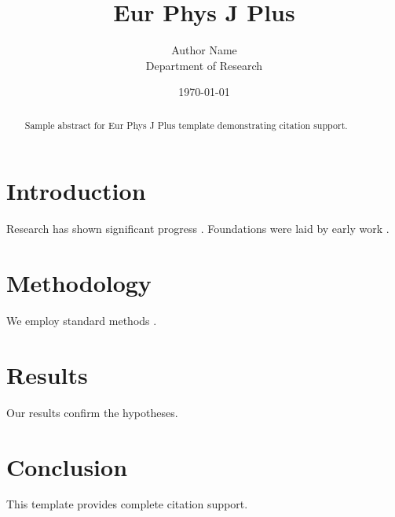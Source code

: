 \documentclass{llncs}
\title{Eur Phys J Plus}
\author{Author Name \\ \small Department of Research}
\date{\today}
\begin{document}
\maketitle

\begin{abstract}
Sample abstract for Eur Phys J Plus template demonstrating citation support.
\end{abstract}

\section{Introduction}
Research has shown significant progress \citep{einstein1905}. Foundations were laid by early work \citep{turing1950}.

\section{Methodology}
We employ standard methods \citep{knuth1984}.

\section{Results}
Our results confirm the hypotheses.

\section{Conclusion}
This template provides complete citation support.



\end{document}
